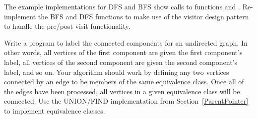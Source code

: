 \begin{projects}
\item
The example implementations for DFS and BFS show calls to functions
 and .
Re-implement the BFS and DFS functions to make use of the visitor
design pattern to handle the pre/post
visit functionality.

\item
Write a program to label the connected components for an undirected
graph.
In other words, all vertices of the first component are given the
first component's label, all vertices of the second component are
given the second component's label, and so on.
Your algorithm should work by defining any two vertices connected by
an edge to be members of the same equivalence
class.
Once all of the edges have been processed, all vertices in a given
equivalence class will be connected.
Use the UNION/FIND implementation from Section~\ref{ParentPointer} to
implement equivalence classes.

\end{projects}
